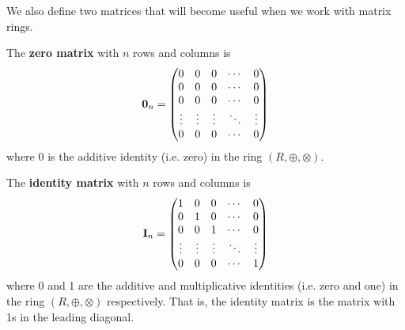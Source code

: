 We also define two matrices that will become useful when we work with matrix rings.
\begin{definition}
    The \textbf{zero matrix} with $n$ rows and columns is
    \[
        \textbf{0}_{n} = 
        \begin{pmatrix}
            0 & 0 & 0 & \cdots & 0 \\
            0 & 0 & 0 & \cdots & 0 \\
            0 & 0 & 0 & \cdots & 0 \\
            \vdots & \vdots & \vdots & \ddots & \vdots \\
            0 & 0 & 0 & \cdots & 0 \\
        \end{pmatrix}
    \]
    where 0 is the additive identity (i.e. zero) in the ring $(R, \oplus, \otimes)$.
\end{definition}
\begin{definition}
    The \textbf{identity matrix} with $n$ rows and columns is
    \[
        \textbf{I}_{n} = 
        \begin{pmatrix}
            1 & 0 & 0 & \cdots & 0 \\
            0 & 1 & 0 & \cdots & 0 \\
            0 & 0 & 1 & \cdots & 0 \\
            \vdots & \vdots & \vdots & \ddots & \vdots \\
            0 & 0 & 0 & \cdots & 1 \\
        \end{pmatrix}
    \]
    where 0 and 1 are the additive and multiplicative identities (i.e. zero and one) in the ring $(R, \oplus, \otimes)$ respectively. That is, the identity matrix is the matrix with 1s in the leading diagonal.
\end{definition}

